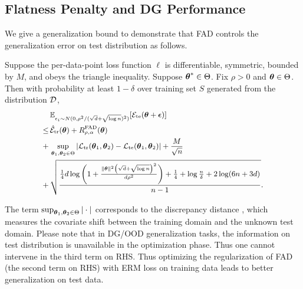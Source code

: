 \subsection{Flatness Penalty and DG Performance} \label{sect:fad-and-dg}

We give a generalization bound to demonstrate that FAD controls the generalization error on test distribution as follows. 

\begin{proposition} \label{prop:ood-bound}
    Suppose the per-data-point loss function $\ell$ is differentiable, symmetric, bounded by $M$, and obeys the triangle inequality. Suppose $\boldsymbol{\theta}^* \in \Theta$. Fix $\rho > 0$ and $\boldsymbol{\theta} \in \Theta$. Then with probability at least $1 - \delta$ over training set $S$ generated from the distribution $\mathcal{D}$,
    \begin{equation} \label{eq:main-bound}
        \small
        \begin{aligned}
            & \, \mathbb{E}_{\epsilon_i \sim N(0, \rho^2/(\sqrt{d} + \sqrt{\log n})^2)}[\mathcal{E}_{{\text{te}}}(\boldsymbol{\theta} + \boldsymbol{\epsilon})] \\
            \le & \, \hat{\mathcal{E}}_{{\text{tr}}}(\boldsymbol{\theta}) + R^{\text{FAD}}_{\rho, \alpha}(\boldsymbol{\theta}) \\ 
            + & \, \sup_{\boldsymbol{\theta}_1, \boldsymbol{\theta}_2 \in \Theta}\left|\mathcal{L}_{{\text{tr}}}(\boldsymbol{\theta}_1, \boldsymbol{\theta}_2) - \mathcal{L}_{{\text{te}}}(\boldsymbol{\theta}_1, \boldsymbol{\theta}_2)\right| + \frac{M}{\sqrt{n}} \\
            + & \, \sqrt{\frac{\frac{1}{4} d \log \left(1+\frac{\|\boldsymbol{\theta}\|^2\left(\sqrt{d} + \sqrt{\log n}\right)^2}{d \rho^2}\right)+\frac{1}{4}+\log \frac{n}{\delta}+2 \log (6 n+3 d)}{n-1}}.
        \end{aligned}
    \end{equation}
\end{proposition}

\begin{remark}
    The term $\sup_{\boldsymbol{\theta}_1, \boldsymbol{\theta}_2 \in \Theta}|\cdot|$ corresponds to the discrepancy distance \cite{mansour2009domain}, which measures the covariate shift between the training domain and the unknown test domain. Please note that in DG/OOD generalization tasks, the information on test distribution is unavailable in the optimization phase. Thus one cannot intervene in the third term on RHS. Thus optimizing the regularization of FAD (the second term on RHS) with ERM loss on training data leads to better generalization on test data.
    
\end{remark}

